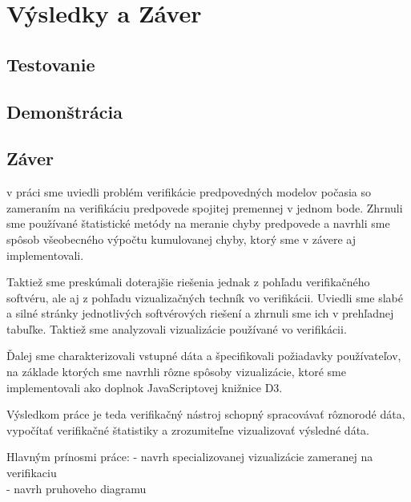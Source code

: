 \chapter{Výsledky a Záver}

\section{Testovanie}

\section{Demonštrácia}

\section{Záver}
v práci sme uviedli problém verifikácie predpovedných modelov počasia so zameraním na verifikáciu predpovede spojitej premennej v jednom bode. Zhrnuli sme používané štatistické metódy na meranie chyby predpovede a navrhli sme spôsob všeobecného výpočtu kumulovanej chyby, ktorý sme v závere aj implementovali.

Taktiež sme preskúmali doterajšie riešenia jednak z pohľadu verifikačného softvéru, ale aj z pohľadu vizualizačných techník vo verifikácii. Uviedli sme slabé a silné stránky jednotlivých softvérových riešení a zhrnuli sme ich v prehľadnej tabuľke. Taktiež sme analyzovali vizualizácie používané vo verifikácii.

Ďalej sme charakterizovali vstupné dáta a špecifikovali požiadavky používateľov, na základe ktorých sme navrhli rôzne spôsoby vizualizácie, ktoré sme implementovali ako doplnok JavaScriptovej knižnice D3.

Výsledkom práce je teda verifikačný nástroj schopný spracovávať rôznorodé dáta, vypočítať verifikačné štatistiky a zrozumiteľne vizualizovať výsledné dáta.

Hlavným prínosmi práce:
- navrh specializovanej vizualizácie zameranej na verifikaciu \\
- navrh pruhoveho diagramu \\


 